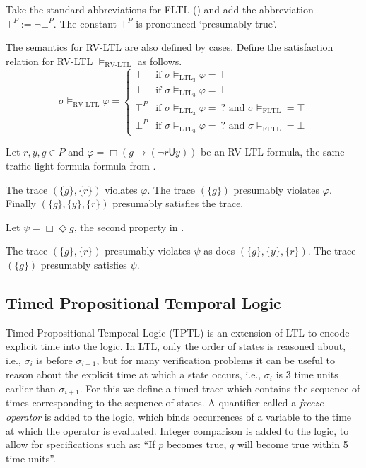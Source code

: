 \documentclass[a4paper]{article}
\newcommand{\U}{\mathsf{U}}
\newcommand{\tand}{\text{ and }}
\newcommand{\ltlt}{LTL$_3$}
\begin{document}
\begin{notn}

  Take the standard abbreviations for FLTL () and add the abbreviation $\top^P := \neg \bot^P$. The constant $\top^P$ is pronounced `presumably true'.
\end{notn}

\begin{defn}\label{rvltlsem}

  The semantics for RV-LTL are also defined by cases.
  Define the satisfaction relation for RV-LTL $\vDash_{\text{RV-LTL}}$ as follows.
  \[\sigma\vDash_{\text{RV-LTL}}\varphi =
    \begin{cases}
      \top & \text{if } \sigma \vDash_{\text{\ltlt}} \varphi = \top\\
      \bot & \text{if } \sigma \vDash_{\text{\ltlt}} \varphi = \bot\\
      \top^P & \text{if } \sigma \vDash_{\text{\ltlt}} \varphi = ~?\tand \sigma\vDash_{\text{FLTL}} = \top \\
      \bot^P & \text{if } \sigma \vDash_{\text{\ltlt}} \varphi = ~?\tand \sigma\vDash_{\text{FLTL}} = \bot
    \end{cases}
  \]
\end{defn}

\begin{eg}
Let $r,y,g\in P$ and $\varphi = \Box (g \to (\neg r \U y))$ be an RV-LTL formula, the same traffic light formula formula from .

  The trace $(\{g\},\{r\})$ violates $\varphi$. The trace $(\{g\})$ presumably violates $\varphi$. Finally $(\{g\},\{y\},\{r\})$ presumably satisfies the trace.

  Let $\psi = \Box \Diamond g $, the second property in .

  The trace $(\{g\},\{r\})$ presumably violates $\psi$ as does $(\{g\},\{y\},\{r\})$. The trace $(\{g\})$ presumably satisfies $\psi$.
\end{eg}

\subsection{Timed Propositional Temporal Logic}
Timed Propositional Temporal Logic (TPTL)\autocite{alur1994really} is an extension of LTL to encode explicit time into the logic.
In LTL, only the order of states is reasoned about, i.e., $\sigma_i$ is before $\sigma_{i+1}$, but for many verification problems it can be useful to reason about the explicit time at which a state occurs, i.e., $\sigma_i$ is 3 time units earlier than $\sigma_{i+1}$.
For this we define a timed trace which contains the sequence of times corresponding to the sequence of states.
A quantifier called a \emph{freeze operator} is added to the logic, which binds occurrences of a variable to the time at which the operator is evaluated.
Integer comparison is added to the logic, to allow for specifications such as: ``If $p$ becomes true, $q$ will become true within 5 time units''.
\end{document}
